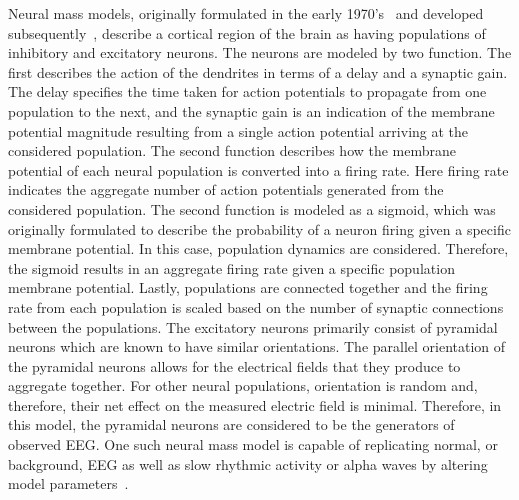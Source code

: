 Neural mass models, originally formulated in the early 1970's~\citep{wilson1973mathematical,lopes1974model,freeman1963electrical} and developed subsequently~\citep{jansen1995electroencephalogram}, describe a cortical region of the brain as having populations of inhibitory and excitatory neurons. The neurons are modeled by two function. The first describes the action of the dendrites in terms of a delay and a synaptic gain. The delay specifies the time taken for action potentials to propagate from one population to the next, and the synaptic gain is an indication of the membrane potential magnitude resulting from a single action potential arriving at the considered population. The second function describes how the membrane potential of each neural population is converted into a firing rate. Here firing rate indicates the aggregate number of action potentials generated from the considered population. The second function is modeled as a sigmoid, which was originally formulated to describe the probability of a neuron firing given a specific membrane potential. In this case, population dynamics are considered. Therefore, the sigmoid results in an aggregate firing rate given a specific population membrane potential. Lastly, populations are connected together and the firing rate from each population is scaled based on the number of synaptic connections between the populations. The excitatory neurons primarily consist of pyramidal neurons which are known to have similar orientations. The parallel orientation of the pyramidal neurons allows for the electrical fields that they produce to aggregate together. For other neural populations, orientation is random and, therefore, their net effect on the measured electric field is minimal. Therefore, in this model, the pyramidal neurons are considered to be the generators of observed EEG. One such neural mass model is capable of replicating normal, or background, EEG as well as slow rhythmic activity or alpha waves by altering model parameters~\citep{jansen1995electroencephalogram}.

